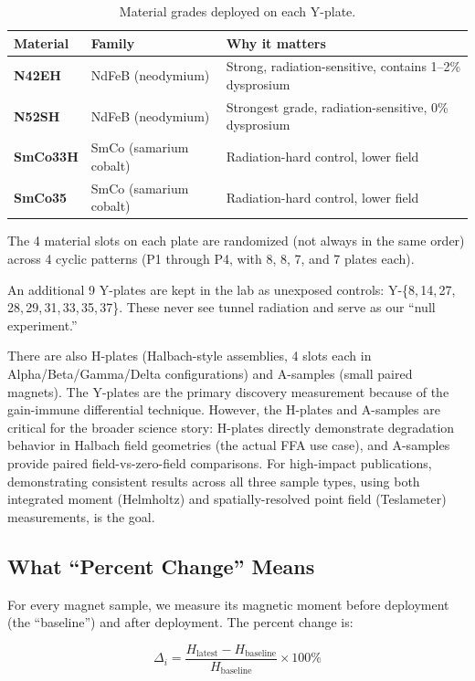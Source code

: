 \documentclass[11pt,letterpaper]{article}
\begin{document}
\begin{table}[htbp]
\centering
\caption{Material grades deployed on each Y-plate.}
\label{tab:materials}
\begin{tabular}{@{}lll@{}}
\toprule
Material & Family & Why it matters \\
\midrule
\textbf{N42EH}  & NdFeB (neodymium)       & Strong, radiation-sensitive, contains 1--2\% dysprosium \\
\textbf{N52SH}  & NdFeB (neodymium)       & Strongest grade, radiation-sensitive, 0\% dysprosium \\
\textbf{SmCo33H}& SmCo (samarium cobalt)  & Radiation-hard control, lower field \\
\textbf{SmCo35} & SmCo (samarium cobalt)  & Radiation-hard control, lower field \\
\bottomrule
\end{tabular}
\end{table}

The 4 material slots on each plate are randomized (not always in the same order)
across 4 cyclic patterns (P1 through P4, with 8, 8, 7, and 7 plates each).

An additional 9 Y-plates are kept in the lab as unexposed controls:
Y-\{8,\,14,\,27,\,28,\,29,\,31,\,33,\,35,\,37\}. These never see tunnel
radiation and serve as our ``null experiment.''

There are also H-plates (Halbach-style assemblies, 4 slots each in
Alpha/Beta/Gamma/Delta configurations) and A-samples (small paired magnets).
The Y-plates are the primary discovery measurement because of the gain-immune
differential technique. However, the H-plates and A-samples are critical for the
broader science story: H-plates directly demonstrate degradation behavior in
Halbach field geometries (the actual FFA use case), and A-samples provide paired
field-vs-zero-field comparisons. For high-impact publications, demonstrating
consistent results across all three sample types, using both integrated moment
(Helmholtz) and spatially-resolved point field (Teslameter) measurements, is the
goal.

\subsection{What ``Percent Change'' Means}

For every magnet sample, we measure its magnetic moment before deployment (the
``baseline'') and after deployment. The percent change is:

\begin{equation*}
\Delta_i = \frac{H_{\mathrm{latest}} - H_{\mathrm{baseline}}}{H_{\mathrm{baseline}}} \times 100\%
\end{equation*}
\end{document}
